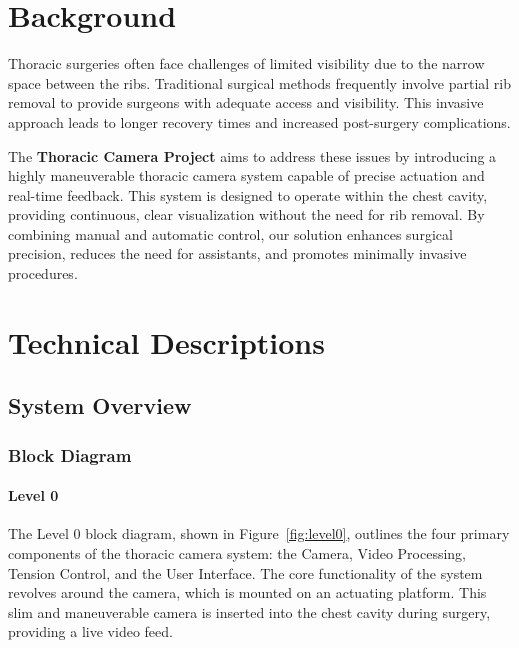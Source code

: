 
\section{Background}
Thoracic surgeries often face challenges of limited visibility due to the narrow space between the ribs. Traditional surgical methods frequently involve partial rib removal to provide surgeons with adequate access and visibility. This invasive approach leads to longer recovery times and increased post-surgery complications.

The \textbf{Thoracic Camera Project} aims to address these issues by introducing a highly maneuverable thoracic camera system capable of precise actuation and real-time feedback. This system is designed to operate within the chest cavity, providing continuous, clear visualization without the need for rib removal. By combining manual and automatic control, our solution enhances surgical precision, reduces the need for assistants, and promotes minimally invasive procedures.

\section{Technical Descriptions}

\subsection{System Overview}
\subsubsection{Block Diagram}

\paragraph{Level 0}
The Level 0 block diagram, shown in Figure~\ref{fig:level0}, outlines the four primary components of the thoracic camera system: the Camera, Video Processing, Tension Control, and the User Interface. The core functionality of the system revolves around the camera, which is mounted on an actuating platform. This slim and maneuverable camera is inserted into the chest cavity during surgery, providing a live video feed.

